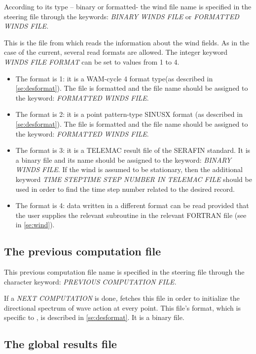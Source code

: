  According to its type -- binary or formatted- the wind file name is specified in the steering file through the keywords: \textit{BINARY WINDS FILE }or\textit{ FORMATTED WINDS FILE.}

 This is the file from which \tomawac reads the information about the wind fields. As in the case of the current, several read formats are allowed. The integer keyword \textit{WINDS FILE FORMAT} can be set to values from 1 to 4.

\begin{itemize}
\item  The format is 1: it is a WAM-cycle 4 format type(as described in \ref{se:desformat}). The file is formatted and the file name should be assigned to the keyword: \textit{FORMATTED WINDS FILE}.
\item  The format is 2: it is a point pattern-type SINUSX format (as described in  \ref{se:desformat}). The file is formatted and the file name should be assigned to the keyword: \textit{FORMATTED WINDS FILE}.
\item  The format is 3: it is a TELEMAC result file of the SERAFIN standard. It is a binary file and its name should be assigned to the keyword: \textit{BINARY WINDS FILE}. If the wind is assumed to be stationary, then the additional keyword \textit{TIME STEPTIME STEP NUMBER IN TELEMAC FILE }should be used in order to find the time step number related to the desired record.
\item  The format is 4: data written in a different format can be read provided that the user supplies the relevant subroutine in the relevant FORTRAN file (see in \ref{se:wind}).
\end{itemize}

\subsection{ The previous computation file}

 This previous computation file name is specified in the steering file through the character keyword: \textit{PREVIOUS COMPUTATION FILE.}

 If a \textit{NEXT COMPUTATION} is done\textit{, }\tomawac fetches this file in order to initialize the directional spectrum of wave action at every point. This file's format, which is specific to \tomawac, is described in \ref{se:desformat}. It is a binary file.

\subsection{ The global results file}

